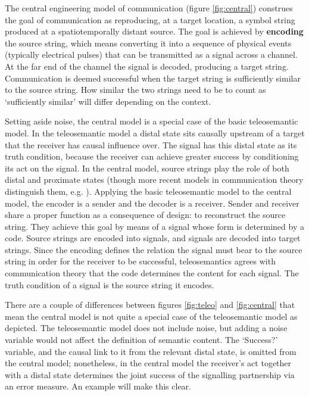 \documentclass[12pt]{article}
\begin{document}
The central engineering model of communication (figure \ref{fig:central}) construes the goal of communication as reproducing, at a target location, a symbol string produced at a spatiotemporally distant source.
The goal is achieved by \textbf{encoding} the source string, which means converting it into a sequence of physical events (typically electrical pulses) that can be transmitted as a signal across a channel.
At the far end of the channel the signal is decoded, producing a target string.
Communication is deemed successful when the target string is sufficiently similar to the source string.
How similar the two strings need to be to count as `sufficiently similar' will differ depending on the context.




Setting aside noise, the central model is a special case of the basic teleosemantic model.
In the teleosemantic model a distal state sits causally upstream of a target that the receiver has causal influence over.
The signal has this distal state as its truth condition, because the receiver can achieve greater success by conditioning its act on the signal.
In the central model, source strings play the role of both distal and proximate states (though more recent models in communication theory distinguish them, e.g. \citet{berger1996ceo}).
Applying the basic teleosemantic model to the central model, the encoder is a sender and the decoder is a receiver.
Sender and receiver share a proper function as a consequence of design: to reconstruct the source string.
They achieve this goal by means of a signal whose form is determined by a code.
Source strings are encoded into signals, and signals are decoded into target strings.
Since the encoding defines the relation the signal must bear to the source string in order for the receiver to be successful, teleosemantics agrees with communication theory that the code determines the content for each signal.
The truth condition of a signal is the source string it encodes.

There are a couple of differences between figures \ref{fig:teleo} and \ref{fig:central} that mean the central model is not quite a special case of the teleosemantic model as depicted.
The teleosemantic model does not include noise, but adding a noise variable would not affect the definition of semantic content.
The `Success?' variable, and the causal link to it from the relevant distal state, is omitted from the central model; nonetheless, in the central model the receiver's act together with a distal state determines the joint success of the signalling partnership via an error measure.
An example will make this clear.
\end{document}
